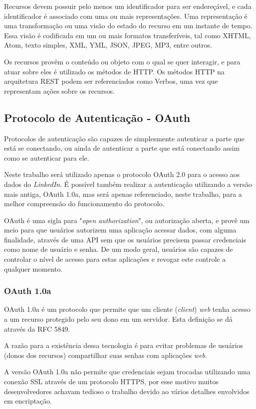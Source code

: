 Recursos devem possuir pelo menos um identificador para ser endereçável, e cada identificador é associado com uma ou mais representações. Uma representação é uma transformação ou uma visão do estado do recurso em um instante de tempo. Essa visão é codificada em um ou mais formatos transferíveis, tal como XHTML, Atom, texto simples, XML, YML, JSON, JPEG, MP3, entre outros. \cite{rest-book}

Os recursos provêm o conteúdo ou objeto com o qual se quer interagir, e para atuar sobre eles é utilizado os métodos de HTTP. Os métodos HTTP na arquitetura REST podem ser referenciados como Verbos, uma vez que representam ações sobre os recursos. \cite{rest-book}


\subsection{Protocolo de Autenticação - OAuth}
Protocolos de autenticação são capazes de simplesmente autenticar a parte que está se conectando, ou ainda de autenticar a parte que está conectando assim como se autenticar para ele.

Neste trabalho será utilizado apenas o protocolo OAuth 2.0 para o acesso aos dados do \textit{LinkedIn}. É possível também realizar a autenticação utilizando a versão mais antiga, OAuth 1.0a, mas será apenas referenciado, neste trabalho, para a melhor compreensão do funcionamento do protocolo.

OAuth é uma sigla para "\textit{open authorization}", ou autorização aberta, e provê um meio para que usuários autorizem uma aplicação acessar dados, com alguma finalidade, através de uma API sem que os usuários precisem passar credenciais como nome de usuário e senha. De um modo geral, usuários são capazes de controlar o nível de acesso para estas aplicações e revogar este controle a qualquer momento. \cite{mining-social-web}

\subsubsection{OAuth 1.0a}
OAuth 1.0a é um protocolo que permite que um cliente (\textit{client}) \textit{web} tenha acesso a um recurso protegido pelo seu dono em um servidor. Esta definição se dá através da RFC 5849.

A razão para a existência dessa tecnologia é para evitar problemas de usuários (donos dos recursos) compartilhar suas senhas com aplicações \textit{web}.

A versão OAuth 1.0a não permite que credenciais sejam trocadas utilizando uma conexão SSL através de um protocolo HTTPS, por esse motivo muitos desenvolvedores achavam tedioso o trabalho devido ao vários detalhes envolvidos em encriptação.

